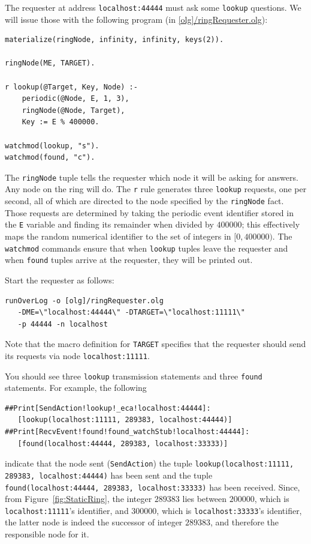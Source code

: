 \documentclass{article}
\begin{document}
The requester at address \lstinline$localhost:44444$ must ask some
\lstinline$lookup$ questions. We will issue those with the following
\ol program (in \url{[olg]/ringRequester.olg}):
\begin{lstlisting}
materialize(ringNode, infinity, infinity, keys(2)).

ringNode(ME, TARGET).

r lookup(@Target, Key, Node) :-
	periodic(@Node, E, 1, 3),
 	ringNode(@Node, Target),
	Key := E % 400000.

watchmod(lookup, "s").
watchmod(found, "c").
\end{lstlisting}
The \lstinline$ringNode$ tuple tells the requester which node it will be
asking for answers. Any node on the ring will do.  The \lstinline$r$
rule generates three \lstinline$lookup$ requests, one per second, all of
which are directed to the node specified by the \lstinline$ringNode$
fact.  Those requests are determined by taking the periodic event
identifier stored in the \lstinline$E$ variable and finding its
remainder when divided by $400000$; this effectively maps the random
numerical identifier to the set of integers in $[0,400000)$. The
\lstinline$watchmod$ commands ensure that when \lstinline$lookup$
tuples leave the requester and when
\lstinline$found$ tuples arrive at the requester, they will be printed out.

Start the requester as follows:
\begin{verbatim}
runOverLog -o [olg]/ringRequester.olg
   -DME=\"localhost:44444\" -DTARGET=\"localhost:11111\"
   -p 44444 -n localhost
\end{verbatim}
Note that the macro definition for \texttt{TARGET} specifies that the
requester should send its requests via node \lstinline$localhost:11111$.

You should see three \lstinline$lookup$ transmission statements and
three \lstinline$found$ statements. For example, the following
\begin{verbatim}
##Print[SendAction!lookup!_eca!localhost:44444]:
   [lookup(localhost:11111, 289383, localhost:44444)]
##Print[RecvEvent!found!found_watchStub!localhost:44444]:
   [found(localhost:44444, 289383, localhost:33333)]
\end{verbatim}
indicate that the node sent (\texttt{SendAction}) the tuple
\lstinline$lookup(localhost:11111, 289383, localhost:44444)$ has been
sent and the tuple \lstinline$found(localhost:44444, 289383, localhost:33333)$ has been received.
Since, from Figure~\ref{fig:StaticRing}, the integer $289383$ lies
between $200000$, which is \lstinline$localhost:11111$'s identifier, and
$300000$, which is \lstinline$localhost:33333$'s identifier, the latter
node is indeed the successor of integer $289383$, and therefore the
responsible node for it.
\end{document}
